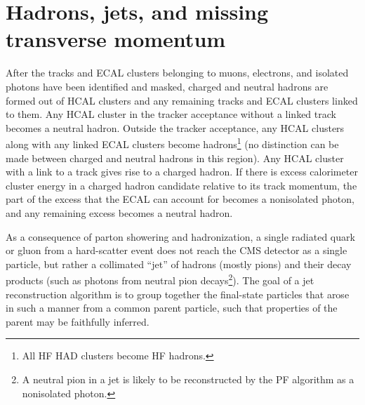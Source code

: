 \section{Hadrons, jets, and missing transverse momentum} \label{sec:reconstruction_jetmet}
After the tracks and ECAL clusters belonging to muons, electrons, and isolated photons have been identified and masked, charged and neutral hadrons are formed out of
HCAL clusters and any remaining tracks and ECAL clusters linked to them. Any HCAL cluster in the tracker acceptance without a linked track becomes a neutral hadron.
Outside the tracker acceptance, any HCAL clusters along with any linked ECAL clusters become hadrons\footnote{All HF HAD clusters become HF hadrons.}
(no distinction can be made between charged and neutral hadrons in this region). Any HCAL cluster with a link to a track gives rise to a charged hadron.
If there is excess calorimeter cluster energy in a charged hadron candidate relative to its track momentum,
the part of the excess that the ECAL can account for becomes a nonisolated photon, and any remaining excess becomes a neutral hadron.

As a consequence of parton showering and hadronization, a single radiated quark or gluon from a hard-scatter event does not reach the CMS detector
as a single particle, but rather a collimated ``jet'' of hadrons (mostly pions) and their decay products (such as photons from neutral pion decays\footnote{A neutral
pion in a jet is likely to be reconstructed by the PF algorithm as a nonisolated photon.}).
The goal of a jet reconstruction algorithm is to group together the final-state particles that arose in such a manner from a common parent particle, such
that properties of the parent may be faithfully inferred.

